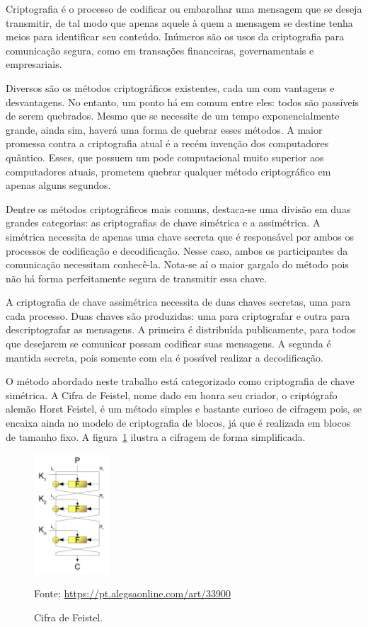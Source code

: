 \documentclass[a4paper,pra,aps,twocolumn,superscriptaddress,10pt,final]{revtex4-2}
\begin{document}
    Criptografia é o processo de codificar ou embaralhar uma mensagem que se deseja transmitir, de tal modo que apenas aquele à quem a mensagem se destine tenha meios para identificar seu conteúdo. Inúmeros são os usos da criptografia para comunicação segura, como em transações financeiras, governamentais e empresariais. 

    Diversos são os métodos criptográficos existentes, cada um com vantagens e desvantagens. No entanto, um ponto há em comum entre eles: todos são passíveis de serem quebrados. Mesmo que se necessite de um tempo exponencialmente grande, ainda sim, haverá uma forma de quebrar esses métodos. A maior promessa contra a criptografia atual é a recém invenção dos computadores quântico. Esses, que possuem um pode computacional muito superior aos computadores atuais, prometem quebrar qualquer método criptográfico em apenas alguns segundos.

    Dentre os métodos criptográficos mais comuns, destaca-se uma divisão em duas grandes categorias: as criptografias de chave simétrica e a assimétrica. A simétrica necessita de apenas uma chave secreta que é responsável por ambos os processos de codificação e decodificação. Nesse caso, ambos os participantes da comunicação necessitam conhecê-la. Nota-se aí o maior gargalo do método pois não há forma perfeitamente segura de transmitir essa chave.
    
    A criptografia de chave assimétrica necessita de duas chaves secretas, uma para cada processo. Duas chaves são produzidas: uma para criptografar e outra para descriptografar as mensagens. A primeira é distribuída publicamente, para todos que desejarem se comunicar possam codificar suas mensagens. A segunda é mantida secreta, pois somente com ela é possível realizar a decodificação.

    O método abordado neste trabalho está categorizado como criptografia de chave simétrica. A Cifra de Feistel, nome dado em honra seu criador, o criptógrafo alemão Horst Feistel, é um método simples e bastante curioso de cifragem pois, se encaixa ainda no modelo de criptografia de blocos, já que é realizada em blocos de tamanho fixo. A figura~\ref{fig:cifra} ilustra a cifragem de forma simplificada.

    \begin{figure}[!htpb]
        \centering
        \label{fig:cifra}
        \caption{Cifra de Feistel.}
        \includegraphics[width=0.25\textwidth]{feistel.png}
        \begin{center}
            \scriptsize{Fonte: \url{https://pt.alegsaonline.com/art/33900}}
        \end{center}
    \end{figure}
\end{document}
